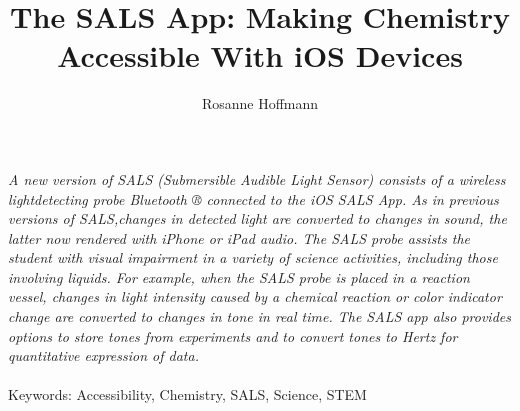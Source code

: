 \documentclass[11.5pt]{sig-alternate} %
\makeatletter
\let\oldabstract\abstract
\let\oldendabstract\endabstract
\renewenvironment{abstract} %
{\renewenvironment{quotation}%
               {\list{}{\addtolength{\leftmargin}{1em} %
                        \listparindent 1.5em%
                        \itemindent    \listparindent%
                        \rightmargin   \leftmargin%
                        \parsep        \z@ \@plus\p@}%
                \item\relax}%
               {\endlist}%
\oldabstract}
{\oldendabstract}
\makeatother
\begin{document}
\title{The SALS App: Making Chemistry Accessible With iOS Devices}

\author[1]{\large \color{blue}Rosanne Hoffmann}


\toappear{}
\maketitle
\begin{@twocolumnfalse} 
\begin{abstract}
\item 
\textit {A new version of SALS (Submersible Audible Light Sensor) consists of a wireless lightdetecting probe Bluetooth ® connected to the iOS SALS App. As in previous versions of SALS,changes in detected light are converted to changes in sound, the latter now rendered with iPhone or iPad audio. The SALS probe assists the student with visual impairment in a variety of science activities, including those involving liquids. For example, when the SALS probe is placed in a reaction vessel, changes in light intensity caused by a chemical reaction or color indicator change are converted to changes in tone in real time. The SALS app also provides options to store tones from experiments and to convert tones to Hertz for quantitative expression of data.}
\\ \\
Keywords: Accessibility, Chemistry, SALS, Science, STEM
\end{abstract}
\end{@twocolumnfalse}

\end{document}
